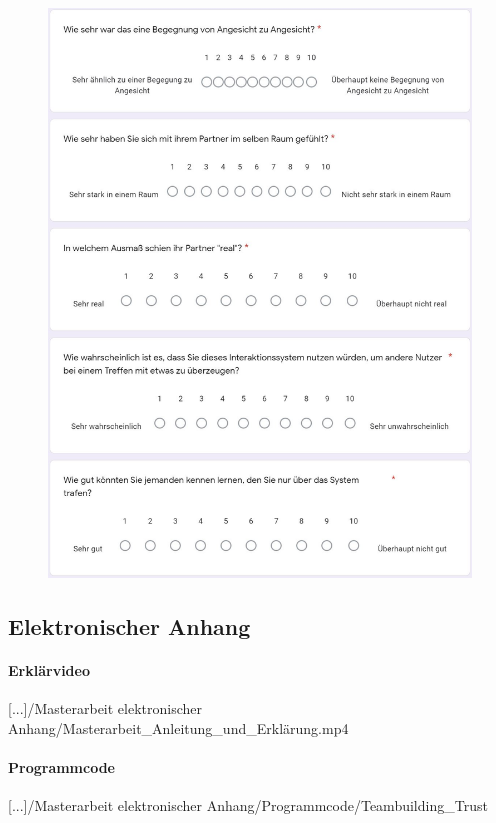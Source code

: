 \documentclass[a4paper,11pt]{article}%
\renewcommand{\\}{\vspace*{0.5\baselineskip} \newline}
\begin{document}
{{	\begin{figure}[H]
	\centering
		\begin{footnotesize}
			\includegraphics[scale=0.6]{Abbildungen/Fragebogen/Post-Questionnaire/PQCP6}
		\end{footnotesize}
	\end{figure}	

\subsection{Elektronischer Anhang}
\label{Erklärvideo}
\paragraph{Erklärvideo}
[...]/Masterarbeit elektronischer Anhang/Masterarbeit\_Anleitung\_und\_Erklärung.mp4

\label{Programmcode}
\paragraph{Programmcode}
[...]/Masterarbeit elektronischer Anhang/Programmcode/Teambuilding\_Trust

}}
\end{document}
